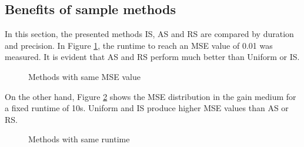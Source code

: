 \subsection{Benefits of sample methods}
In this section, the presented methods IS, AS and RS are compared by duration
and precision.
In Figure \ref{graphic:methods_compare}, the runtime to reach an
MSE value of 0.01 was measured. It is evident that AS and RS perform
much better than Uniform or IS. 
\begin{figure}[H]
  \centerline{
    }
  \caption{Methods with same MSE value}
  \label{graphic:methods_compare}
\end{figure}
On the other hand, Figure \ref{graphic:methods_compare2} shows the MSE
distribution in the gain medium for a fixed runtime of 10s. Uniform and IS 
produce higher MSE values than AS or RS.
\begin{figure}[H]
  \centerline{
    }
  \caption{Methods with same runtime}
  \label{graphic:methods_compare2}
\end{figure}
